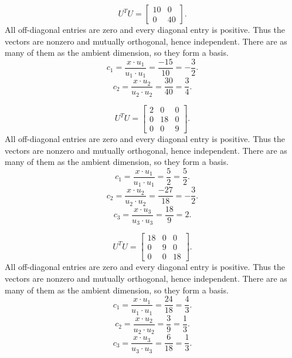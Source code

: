 \[U^TU=\left[\begin{array}{rr}10&0\\0&40\end{array}\right].\]
All off-diagonal entries are zero and every diagonal entry is positive. Thus the vectors are nonzero and mutually orthogonal, hence independent. There are as many of them as the ambient dimension, so they form a basis.
\[c_{1}=\frac{x\cdot u_{1}}{u_{1}\cdot u_{1}}=\frac{-15}{10}=- \frac{3}{2}.\]
\[c_{2}=\frac{x\cdot u_{2}}{u_{2}\cdot u_{2}}=\frac{30}{40}=\frac{3}{4}.\]

\[U^TU=\left[\begin{array}{rrr}2&0&0\\0&18&0\\0&0&9\end{array}\right].\]
All off-diagonal entries are zero and every diagonal entry is positive. Thus the vectors are nonzero and mutually orthogonal, hence independent. There are as many of them as the ambient dimension, so they form a basis.
\[c_{1}=\frac{x\cdot u_{1}}{u_{1}\cdot u_{1}}=\frac{5}{2}=\frac{5}{2}.\]
\[c_{2}=\frac{x\cdot u_{2}}{u_{2}\cdot u_{2}}=\frac{-27}{18}=- \frac{3}{2}.\]
\[c_{3}=\frac{x\cdot u_{3}}{u_{3}\cdot u_{3}}=\frac{18}{9}=2.\]

\[U^TU=\left[\begin{array}{rrr}18&0&0\\0&9&0\\0&0&18\end{array}\right].\]
All off-diagonal entries are zero and every diagonal entry is positive. Thus the vectors are nonzero and mutually orthogonal, hence independent. There are as many of them as the ambient dimension, so they form a basis.
\[c_{1}=\frac{x\cdot u_{1}}{u_{1}\cdot u_{1}}=\frac{24}{18}=\frac{4}{3}.\]
\[c_{2}=\frac{x\cdot u_{2}}{u_{2}\cdot u_{2}}=\frac{3}{9}=\frac{1}{3}.\]
\[c_{3}=\frac{x\cdot u_{3}}{u_{3}\cdot u_{3}}=\frac{6}{18}=\frac{1}{3}.\]

